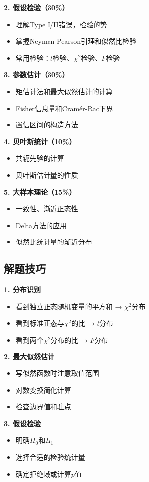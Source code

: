 \documentclass[12pt,a4paper]{article}
\theoremstyle{remark}
\begin{document}
\textbf{2. 假设检验（30\%）}
\begin{itemize}
\item 理解Type I/II错误，检验的势
\item 掌握Neyman-Pearson引理和似然比检验
\item 常用检验：$t$检验、$\chi^2$检验、$F$检验
\end{itemize}

\textbf{3. 参数估计（30\%）}
\begin{itemize}
\item 矩估计法和最大似然估计的计算
\item Fisher信息量和Cramér-Rao下界
\item 置信区间的构造方法
\end{itemize}

\textbf{4. 贝叶斯统计（10\%）}
\begin{itemize}
\item 共轭先验的计算
\item 贝叶斯估计量的性质
\end{itemize}

\textbf{5. 大样本理论（15\%）}
\begin{itemize}
\item 一致性、渐近正态性
\item Delta方法的应用
\item 似然比统计量的渐近分布
\end{itemize}

\subsection{解题技巧}

\textbf{1. 分布识别}
\begin{itemize}
\item 看到独立正态随机变量的平方和 → $\chi^2$分布
\item 看到标准正态与$\chi^2$的比 → $t$分布
\item 看到两个$\chi^2$分布的比 → $F$分布
\end{itemize}

\textbf{2. 最大似然估计}
\begin{itemize}
\item 写似然函数时注意取值范围
\item 对数变换简化计算
\item 检查边界值和驻点
\end{itemize}

\textbf{3. 假设检验}
\begin{itemize}
\item 明确$H_0$和$H_1$
\item 选择合适的检验统计量
\item 确定拒绝域或计算$p$值
\end{itemize}
\end{document}
